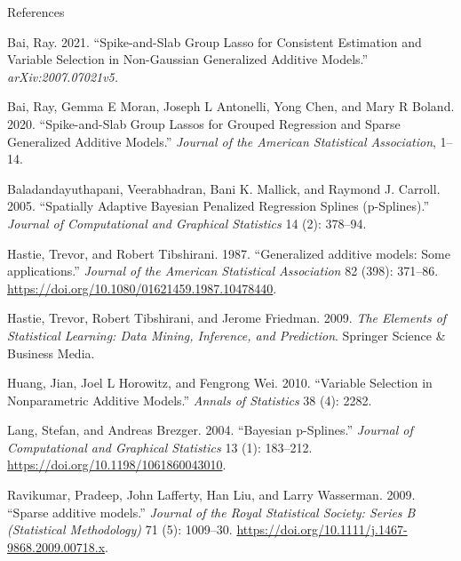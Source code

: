\documentclass[
  ignorenonframetext,
  aspectratio=169]{beamer}
\newlength{\cslhangindent}
\newlength{\cslentryspacingunit} %
\newenvironment{CSLReferences}[2] %
 {%
  \setlength{\parindent}{0pt}
  \ifodd #1
  \let\oldpar\par
  \def\par{\hangindent=\cslhangindent\oldpar}
  \fi
  \setlength{\parskip}{#2\cslentryspacingunit}
 }%
 {}
\begin{document}
\begin{frame}[allowframebreaks]{References}
\hypertarget{refs}{}
\begin{CSLReferences}{1}{0}
\leavevmode{}%
Bai, Ray. 2021. {``Spike-and-Slab Group Lasso for Consistent Estimation
and Variable Selection in Non-Gaussian Generalized Additive Models.''}
\emph{arXiv:2007.07021v5.}

\leavevmode{}%
Bai, Ray, Gemma E Moran, Joseph L Antonelli, Yong Chen, and Mary R
Boland. 2020. {``Spike-and-Slab Group Lassos for Grouped Regression and
Sparse Generalized Additive Models.''} \emph{Journal of the American
Statistical Association}, 1--14.

\leavevmode{}%
Baladandayuthapani, Veerabhadran, Bani K. Mallick, and Raymond J.
Carroll. 2005. {``Spatially Adaptive Bayesian Penalized Regression
Splines (p-Splines).''} \emph{Journal of Computational and Graphical
Statistics} 14 (2): 378--94.

\leavevmode{}%
Hastie, Trevor, and Robert Tibshirani. 1987. {``{Generalized additive
models: Some applications}.''} \emph{Journal of the American Statistical
Association} 82 (398): 371--86.
\url{https://doi.org/10.1080/01621459.1987.10478440}.

\leavevmode{}%
Hastie, Trevor, Robert Tibshirani, and Jerome Friedman. 2009. \emph{The
Elements of Statistical Learning: Data Mining, Inference, and
Prediction}. Springer Science \& Business Media.

\leavevmode{}%
Huang, Jian, Joel L Horowitz, and Fengrong Wei. 2010. {``Variable
Selection in Nonparametric Additive Models.''} \emph{Annals of
Statistics} 38 (4): 2282.

\leavevmode{}%
Lang, Stefan, and Andreas Brezger. 2004. {``Bayesian p-Splines.''}
\emph{Journal of Computational and Graphical Statistics} 13 (1):
183--212. \url{https://doi.org/10.1198/1061860043010}.

\leavevmode{}%
Ravikumar, Pradeep, John Lafferty, Han Liu, and Larry Wasserman. 2009.
{``{Sparse additive models}.''} \emph{Journal of the Royal Statistical
Society: Series B (Statistical Methodology)} 71 (5): 1009--30.
\url{https://doi.org/10.1111/j.1467-9868.2009.00718.x}.


\end{CSLReferences}
\end{frame}
\end{document}
